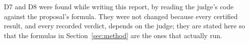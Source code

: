 D7 and D8 were found while writing this report, by reading the judge's code against the proposal's formula. They were not changed because every certified result, and every recorded verdict, depends on the judge; they are stated here so that the formulas in Section~\ref{sec:method} are the ones that actually run.
